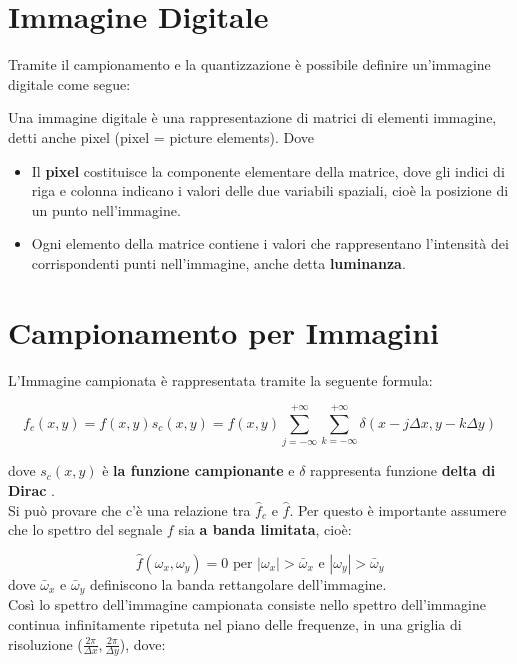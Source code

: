 \section{Immagine Digitale}
Tramite il campionamento e la quantizzazione è possibile definire un'immagine
digitale come segue:
\begin{definition}
    Una immagine digitale è una rappresentazione di matrici di elementi
    immagine, detti anche pixel (pixel = picture elements). Dove

    \begin{itemize}
        \item Il \textbf{pixel} costituisce la componente elementare della
              matrice, dove gli indici di riga e colonna indicano i valori delle
              due variabili spaziali, cioè la posizione di un punto
              nell'immagine.
        \item Ogni elemento della matrice contiene i valori che rappresentano
              l'intensità dei corrispondenti punti nell'immagine, anche detta
              \textbf{luminanza}.
    \end{itemize}
\end{definition}

\section{Campionamento per Immagini}
L'Immagine campionata è rappresentata tramite la seguente formula:

$$
    f_c(x,y) = f(x,y)s_c(x,y)=f(x,y)\sum_{j=-\infty}^{+\infty}
    \sum_{k=-\infty}^{+\infty} \delta (x-j \Delta x, y-k \Delta y)
$$

dove $s_c(x,y)$ è \textbf{la funzione campionante} e $\delta$ rappresenta
funzione \textbf{delta di Dirac} .\\

Si può provare che c'è una relazione tra $\hat{f}_c$ e $\hat{f}$. Per questo è
importante assumere che lo spettro del segnale $f$ sia \textbf{a banda
    limitata}, cioè:

$$
    \hat{f}(\omega_x, \omega_y)=0 \text{ per } |\omega_x| > \bar{\omega}_x \text{ e } |\omega_y| > \bar{\omega}_y
$$
dove $\bar{\omega}_x$ e $\bar{\omega}_y$ definiscono la banda rettangolare
dell'immagine.\\

Così lo spettro dell'immagine campionata consiste nello spettro dell'immagine
continua infinitamente ripetuta nel piano delle frequenze, in una griglia di
risoluzione ($\frac{2\pi}{\Delta x}, \frac{2 \pi}{\Delta y}$), dove:

